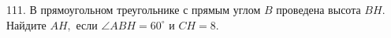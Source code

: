 111. В прямоугольном треугольнике с прямым углом $B$ проведена высота $BH.$ Найдите $AH,$ если $\angle ABH=60^\circ$ и $CH=8.$\\
